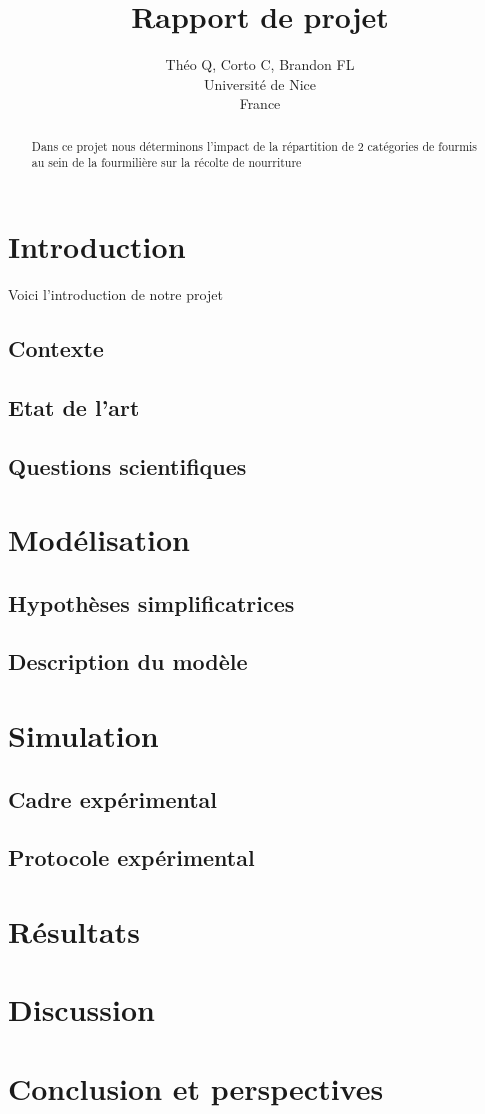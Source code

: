 \documentclass{article}
\title{Rapport de projet}
\author{Théo Q, Corto C, Brandon FL \\
Université de Nice\\
France}
\begin{document}
\maketitle


\begin{abstract} Dans ce projet nous déterminons l'impact de la répartition de 2 catégories de fourmis au sein de la fourmilière sur la récolte de nourriture \end{abstract}
\section{Introduction}
Voici l'introduction de notre projet
\subsection{Contexte}
\subsection{Etat de l'art}
\subsection{Questions scientifiques}
\section{Modélisation}
\subsection{Hypothèses simplificatrices}
\subsection{Description du modèle}
\section{Simulation}
\subsection{Cadre expérimental}
\subsection{Protocole expérimental}
\section{Résultats}
\section{Discussion}
\section*{Conclusion et perspectives}
\end{document}
